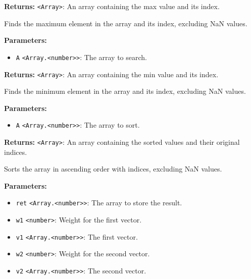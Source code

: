 \documentclass[12pt,a4paper]{article}
\begin{document}
\noindent \textbf{Returns:} \texttt{<Array>}: An array containing the max value and its index.

\noindent Finds the maximum element in the array and its index, excluding NaN values.

\vspace{5mm}
\noindent {}


\noindent \textbf{Parameters:}
\begin{itemize}
  \item \texttt{A} \texttt{<Array.<number>>}: The array to search.
\end{itemize}

\noindent \textbf{Returns:} \texttt{<Array>}: An array containing the min value and its index.

\noindent Finds the minimum element in the array and its index, excluding NaN values.

\vspace{5mm}
\noindent {}


\noindent \textbf{Parameters:}
\begin{itemize}
  \item \texttt{A} \texttt{<Array.<number>>}: The array to sort.
\end{itemize}

\noindent \textbf{Returns:} \texttt{<Array>}: An array containing the sorted values and their original indices.

\noindent Sorts the array in ascending order with indices, excluding NaN values.

\vspace{5mm}
\noindent {}


\noindent \textbf{Parameters:}
\begin{itemize}
  \item \texttt{ret} \texttt{<Array.<number>>}: The array to store the result.
  \item \texttt{w1} \texttt{<number>}: Weight for the first vector.
  \item \texttt{v1} \texttt{<Array.<number>>}: The first vector.
  \item \texttt{w2} \texttt{<number>}: Weight for the second vector.
  \item \texttt{v2} \texttt{<Array.<number>>}: The second vector.
\end{itemize}
\end{document}
